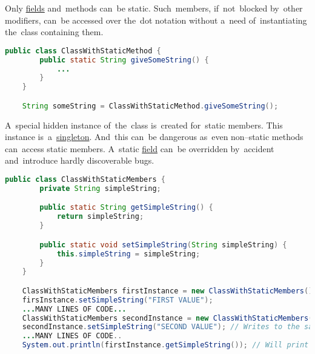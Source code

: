 \label{javaaccessmodifiers}

\label{javapublic}

\label{javaprotected}

\label{javaprivate}

\label{javastatic}
Only \hyperref[variablefieldproperty]{fields} and~methods can~be static.
Such~members, if~not~blocked by~other modifiers, can~be accessed over the~dot notation without a~need of~instantiating the~class containing them.

\begin{lstlisting}[language=Java]
    public class ClassWithStaticMethod {
        public static String giveSomeString() {
            ...
        }
    }

    String someString = ClassWithStaticMethod.giveSomeString();
\end{lstlisting}

\warning A~special hidden instance of~the~class is~created for~static members.
This instance is~a~\hyperref[singletondp]{singleton}.
And~this can~be dangerous as~even non--static methods can~access static members.
A~static \hyperref[variablefieldproperty]{field} can~be overridden by~accident and~introduce hardly discoverable bugs.

\begin{lstlisting}[language=Java]
    public class ClassWithStaticMembers {
        private String simpleString;

        public static String getSimpleString() {
            return simpleString;
        }

        public static void setSimpleString(String simpleString) {
            this.simpleString = simpleString;
        }
    }

    ClassWithStaticMembers firstInstance = new ClassWithStaticMembers();
    firsInstance.setSimpleString("FIRST VALUE");
    ...MANY LINES OF CODE...
    ClassWithStaticMembers secondInstance = new ClassWithStaticMembers();
    secondInstance.setSimpleString("SECOND VALUE"); // Writes to the same instance
    ...MANY LINES OF CODE..
    System.out.println(firstInstance.getSimpleString()); // Will print "SECOND VALUE"
\end{lstlisting}

\label{javafinal}

\label{javasynchronized}

\label{noaccessmodifier}
